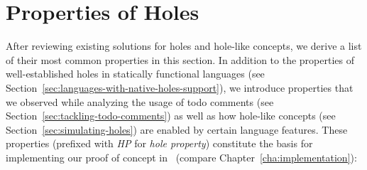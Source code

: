 \section{Properties of Holes}
\label{sec:relevant-properties}
After reviewing existing solutions for holes and hole-like concepts, we derive a list of their most common properties in this section.
In addition to the properties of well-established holes in statically functional languages (see Section~\ref{sec:languages-with-native-holes-support}), we introduce properties that we observed while analyzing the usage of todo comments (see Section~\ref{sec:tackling-todo-comments}) as well as how hole-like concepts (see Section~\ref{sec:simulating-holes}) are enabled by certain language features.
These properties (prefixed with \emph{HP} for \emph{hole property}) constitute the basis for implementing our proof of concept in \CS\ (compare Chapter~\ref{cha:implementation}):
%
